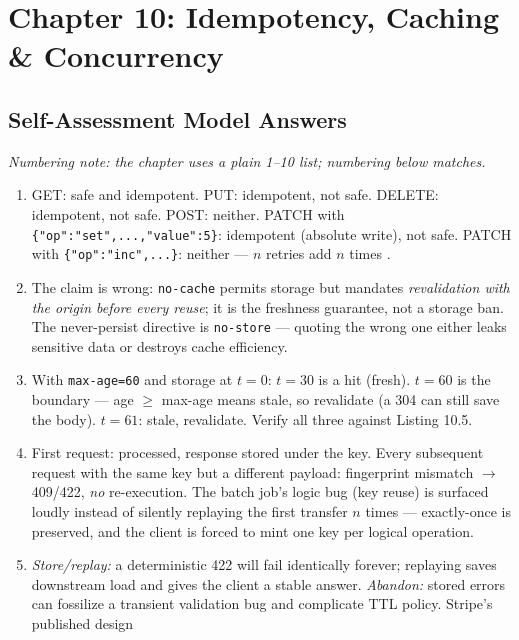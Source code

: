 \section{Chapter 10: Idempotency, Caching \& Concurrency}
\label{sec:sol-ch10}

\subsection{Self-Assessment Model Answers}

\emph{Numbering note: the chapter uses a plain 1--10 list; numbering below
matches.}

\begin{enumerate}[leftmargin=2.2em]
  \item GET: safe and idempotent. PUT: idempotent, not safe. DELETE:
    idempotent, not safe. POST: neither. PATCH with
    \texttt{\{"op":"set",...,"value":5\}}: idempotent (absolute write), not
    safe. PATCH with \texttt{\{"op":"inc",...\}}: neither --- $n$ retries
    add $n$ times \cite{rfc9110}.
  \item The claim is wrong: \texttt{no-cache} permits storage but mandates
    \emph{revalidation with the origin before every reuse}; it is the
    freshness guarantee, not a storage ban. The never-persist directive is
    \texttt{no-store} --- quoting the wrong one either leaks sensitive data
    or destroys cache efficiency.
  \item With \texttt{max-age=60} and storage at $t{=}0$: $t{=}30$ is a hit
    (fresh). $t{=}60$ is the boundary --- age $\geq$ max-age means stale,
    so revalidate (a 304 can still save the body). $t{=}61$: stale,
    revalidate. Verify all three against Listing 10.5.
  \item First request: processed, response stored under the key. Every
    subsequent request with the same key but a different payload: fingerprint
    mismatch $\to$ 409/422, \emph{no} re-execution. The batch job's logic
    bug (key reuse) is surfaced loudly instead of silently replaying the
    first transfer $n$ times --- exactly-once is preserved, and the client
    is forced to mint one key per logical operation.
  \item \emph{Store/replay:} a deterministic 422 will fail identically
    forever; replaying saves downstream load and gives the client a stable
    answer. \emph{Abandon:} stored errors can fossilize a transient
    validation bug and complicate TTL policy. Stripe's published design

\end{enumerate}
